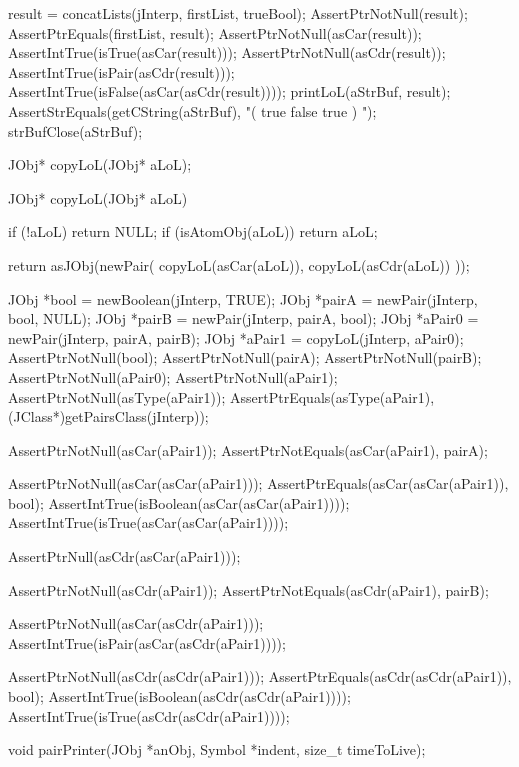  result = concatLists(jInterp, firstList, trueBool);
  AssertPtrNotNull(result);
  AssertPtrEquals(firstList, result);
  AssertPtrNotNull(asCar(result));
  AssertIntTrue(isTrue(asCar(result)));
  AssertPtrNotNull(asCdr(result));
  AssertIntTrue(isPair(asCdr(result)));
  AssertIntTrue(isFalse(asCar(asCdr(result))));
  printLoL(aStrBuf, result);
  AssertStrEquals(getCString(aStrBuf), "( true false true ) ");
  strBufClose(aStrBuf);
\stopCTest
\skipTestCase
\stopTestSuite

\startTestSuite[copyLoL]

\startCHeader
JObj* copyLoL(JObj* aLoL);
\stopCHeader

\startCCode
JObj* copyLoL(JObj* aLoL) {
  if (!aLoL) return NULL;
  if (isAtomObj(aLoL)) return aLoL;

  return asJObj(newPair(
    copyLoL(asCar(aLoL)),
    copyLoL(asCdr(aLoL))
  ));
}
\stopCCode


\startCTest
  JObj *bool   = newBoolean(jInterp, TRUE);
  JObj *pairA  = newPair(jInterp, bool, NULL);
  JObj *pairB  = newPair(jInterp, pairA, bool);
  JObj *aPair0 = newPair(jInterp, pairA, pairB);
  JObj *aPair1 = copyLoL(jInterp, aPair0);
  AssertPtrNotNull(bool);
  AssertPtrNotNull(pairA);
  AssertPtrNotNull(pairB);
  AssertPtrNotNull(aPair0);
  AssertPtrNotNull(aPair1);
  AssertPtrNotNull(asType(aPair1));
  AssertPtrEquals(asType(aPair1),
    (JClass*)getPairsClass(jInterp));

  AssertPtrNotNull(asCar(aPair1));
  AssertPtrNotEquals(asCar(aPair1), pairA);

  AssertPtrNotNull(asCar(asCar(aPair1)));
  AssertPtrEquals(asCar(asCar(aPair1)), bool);
  AssertIntTrue(isBoolean(asCar(asCar(aPair1))));
  AssertIntTrue(isTrue(asCar(asCar(aPair1))));

  AssertPtrNull(asCdr(asCar(aPair1)));

  AssertPtrNotNull(asCdr(aPair1));
  AssertPtrNotEquals(asCdr(aPair1), pairB);

  AssertPtrNotNull(asCar(asCdr(aPair1)));
  AssertIntTrue(isPair(asCar(asCdr(aPair1))));

  AssertPtrNotNull(asCdr(asCdr(aPair1)));
  AssertPtrEquals(asCdr(asCdr(aPair1)), bool);
  AssertIntTrue(isBoolean(asCdr(asCdr(aPair1))));
  AssertIntTrue(isTrue(asCdr(asCdr(aPair1))));
\stopCTest
\skipTestCase
\stopTestSuite

\startCHeader
void pairPrinter(JObj *anObj, Symbol *indent, size_t timeToLive);
\stopCHeader

